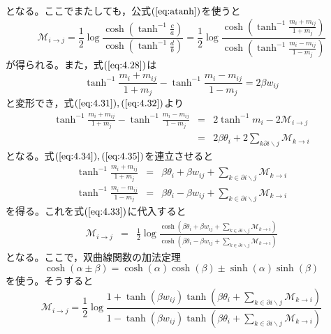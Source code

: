 となる。ここでまたしても，公式$(\ref{eq:atanh})$を使うと
\begin{equation}
\mathcal{M}_{i\rightarrow j}=\frac{1}{2}\log\frac{\displaystyle
\cosh\left(\tanh^{-1}\frac{c}{a}\right)}
{\displaystyle\cosh\left(\tanh^{-1}\frac{d}{b}\right)}
=\frac{1}{2}\log
\frac{\displaystyle\cosh\left(\tanh^{-1}\frac{m_{i}+m_{ij}}{1+m_{j}}\right)}
{\displaystyle\cosh\left(\tanh^{-1}\frac{m_{i}-m_{ij}}{1-m_{j}}\right)}
\label{eq:4.33}
\end{equation}
が得られる。また，式$(\ref{eq:4.28})$は
\begin{equation}
\tanh^{-1}\frac{m_{i}+m_{ij}}{1+m_{j}}-\tanh^{-1}\frac{m_{i}-m_{ij}}{1-m_{j}}
=2\beta w_{ij}\label{eq:4.34}
\end{equation}
と変形でき，式$(\ref{eq:4.31}),(\ref{eq:4.32})$より
\begin{eqnarray}
\tanh^{-1}\frac{m_{i}+m_{ij}}{1+m_{j}}-\tanh^{-1}\frac{m_{i}-m_{ij}}{1-m_{j}}
&=&2\tanh^{-1}m_{i}-2\mathcal{M}_{i\rightarrow j}\nonumber\\
&=&2\beta\theta_{i}+2\sum_{k\partial i\backslash j}\mathcal{M}_{k\rightarrow i}
\label{eq:4.35}
\end{eqnarray}
となる。式$(\ref{eq:4.34}),(\ref{eq:4.35})$を連立させると
\begin{eqnarray}
\tanh^{-1}\frac{m_{i}+m_{ij}}{1+m_{j}}&=&\beta\theta_{i}+\beta w_{ij}
+\sum_{k\in\partial i\backslash j}\mathcal{M}_{k\rightarrow i}\label{eq:4.36}\\
\tanh^{-1}\frac{m_{i}-m_{ij}}{1-m_{j}}&=&\beta\theta_{i}-\beta w_{ij}
+\sum_{k\in\partial i\backslash j}\mathcal{M}_{k\rightarrow i}\label{eq:4.37}
\end{eqnarray}
を得る。これを式$(\ref{eq:4.33})$に代入すると
\begin{eqnarray}
\mathcal{M}_{i\rightarrow j}&=&\frac{1}{2}\log
\frac{\displaystyle\cosh\left(\beta\theta_{i}+\beta w_{ij}
+\sum_{k\in\partial i\backslash j}\mathcal{M}_{k\rightarrow i}\right)}
{\displaystyle\cosh\left(\beta\theta_{i}-\beta w_{ij}
+\sum_{k\in\partial i\backslash j}\mathcal{M}_{k\rightarrow i}\right)}\nonumber
\end{eqnarray}
となる。ここで，双曲線関数の加法定理
\begin{equation}
\cosh(\alpha\pm\beta)=\cosh(\alpha)\cosh(\beta)\pm\sinh(\alpha)\sinh(\beta)
\nonumber
\end{equation}
を使う。そうすると
\begin{equation}
\mathcal{M}_{i\rightarrow j}=\frac{1}{2}\log\frac{
\displaystyle 1+\tanh(\beta w_{ij})\tanh\left(\beta\theta_{i}+
\sum_{k\in\partial i\backslash j}\mathcal{M}_{k\rightarrow i}\right)}
{\displaystyle 1-\tanh(\beta w_{ij})\tanh\left(\beta\theta_{i}+
\sum_{k\in\partial i\backslash j}\mathcal{M}_{k\rightarrow i}\right)}
\label{eq:4.39}
\end{equation}
